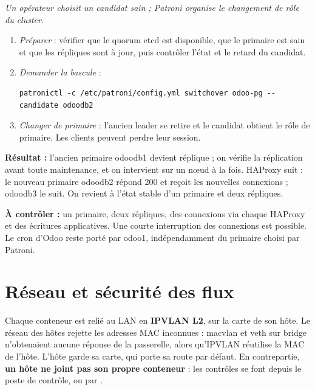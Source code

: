 \documentclass[11pt,a4paper]{article}
\newcommand{\code}[1]{\texttt{\detokenize{#1}}}
\newenvironment{lecture}[1]{%
  \begin{tcolorbox}[breakable, enhanced, colback=gray!4, colframe=gray!55,
    boxrule=0.5pt, arc=1mm, left=2mm, right=2mm, top=1mm, bottom=1mm,
    fonttitle=\bfseries\small, title={Lecture du schéma~\thefigure}]
  \raggedright\emph{#1}\par\smallskip\small}
  {\end{tcolorbox}}
\begin{document}
\begin{lecture}{Un opérateur choisit un candidat sain ; Patroni organise le changement de rôle du cluster.}
\begin{enumerate}
  \item \emph{Préparer} : vérifier que le quorum etcd est disponible, que le
        primaire est sain et que les répliques sont à jour, puis contrôler
        l'état et le retard du candidat.
  \item \emph{Demander la bascule} :
\begin{lstlisting}
patronictl -c /etc/patroni/config.yml switchover odoo-pg --candidate odoodb2
\end{lstlisting}
  \item \emph{Changer de primaire} : l'ancien leader se retire et le candidat
        obtient le rôle de primaire. Les clients peuvent perdre leur session.
\end{enumerate}
\textbf{Résultat :} l'ancien primaire odoodb1 devient réplique ; on vérifie la
réplication avant toute maintenance, et on intervient sur un nœud à la fois.
HAProxy suit \code{/primary} : le nouveau primaire odoodb2 répond 200 et
reçoit les nouvelles connexions ; odoodb3 le suit. On revient à l'état stable
d'un primaire et deux répliques.

\textbf{À contrôler :} un primaire, deux répliques, des connexions via chaque
HAProxy et des écritures applicatives. Une courte interruption des connexions
est possible. Le cron d'Odoo reste porté par odoo1, indépendamment du
primaire choisi par Patroni.\end{lecture}


\section{Réseau et sécurité des flux}

Chaque conteneur est relié au LAN en \textbf{IPVLAN L2}, sur la carte de son
hôte. Le réseau des hôtes rejette les adresses MAC inconnues : macvlan et veth
sur bridge n'obtenaient aucune réponse de la passerelle, alors qu'IPVLAN
réutilise la MAC de l'hôte. L'hôte garde sa carte, qui porte sa route par
défaut. En contrepartie, \textbf{un hôte ne joint pas son propre conteneur} :
les contrôles se font depuis le poste de contrôle, ou par \code{lxc-attach}.
\end{document}
